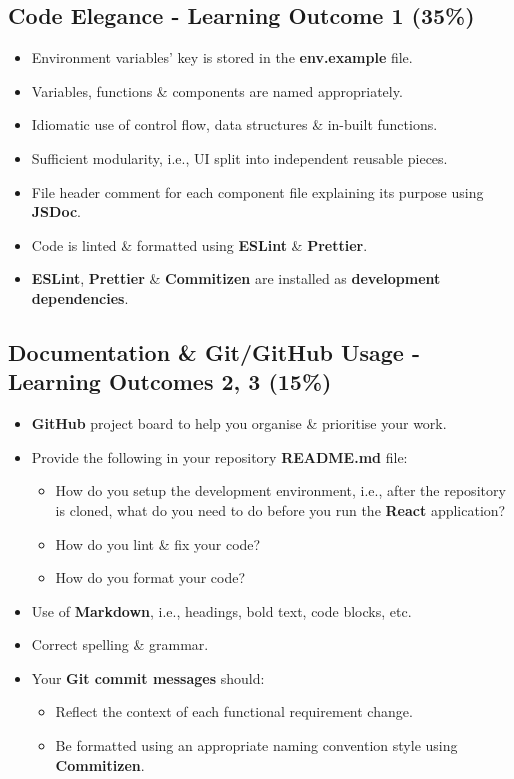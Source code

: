 \documentclass{article}
\begin{document}
\subsection*{Code Elegance - Learning Outcome 1 (35\%)}
\begin{itemize}
	\item Environment variables' key is stored in the \textbf{env.example} file. 
	\item Variables, functions \& components are named appropriately.
	\item Idiomatic use of control flow, data structures \& in-built functions.
	\item Sufficient modularity, i.e., UI split into independent reusable pieces.
	\item File header comment for each component file explaining its purpose using \textbf{JSDoc}.
	\item Code is linted \& formatted using \textbf{ESLint} \& \textbf{Prettier}.
	\item \textbf{ESLint}, \textbf{Prettier} \& \textbf{Commitizen} are installed as \textbf{development dependencies}.	
\end{itemize}

\subsection*{Documentation \& Git/GitHub Usage - Learning Outcomes 2, 3 (15\%)}
\begin{itemize}
	\item \textbf{GitHub} project board to help you organise \& prioritise your work. 
	\item Provide the following in your repository \textbf{README.md} file:
	\begin{itemize}
		\item How do you setup the development environment, i.e., after the repository is cloned, what do you need to do before you run the \textbf{React} application?
		\item How do you lint \& fix your code?
		\item How do you format your code?
	\end{itemize}
	\item Use of \textbf{Markdown}, i.e., headings, bold text, code blocks, etc.
	\item Correct spelling \& grammar. 
	\item Your \textbf{Git commit messages} should:
	\begin{itemize}
		\item Reflect the context of each functional requirement change.
		\item Be formatted using an appropriate naming convention style using \textbf{Commitizen}.
	\end{itemize}	
\end{itemize}
\end{document}
